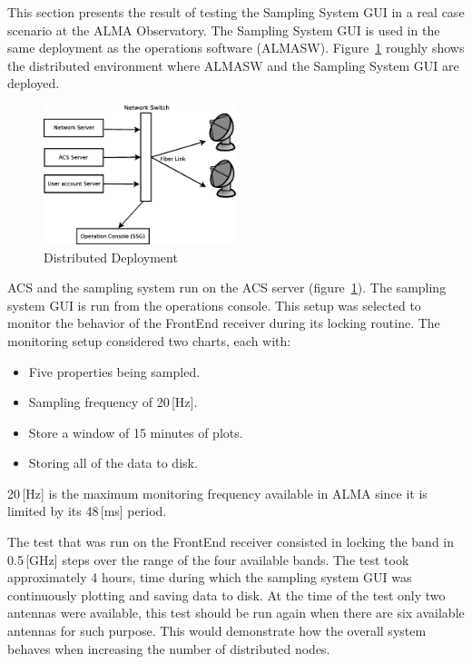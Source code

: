 This section presents the result of testing the Sampling System GUI
in a real case scenario at the ALMA Observatory.
The Sampling System GUI is used in the same deployment as
the operations software (ALMASW).
Figure~\ref{fg:deployment} roughly shows the distributed
environment where ALMASW and the Sampling System GUI are deployed.

\begin{figure}%
  \begin{center}
  \includegraphics[width=0.50\textwidth]{../img/deployment}
  \end{center}
  \caption{Distributed Deployment}
  \label{fg:deployment}
\end{figure}

ACS and the sampling system run on the ACS server
(figure~\ref{fg:deployment}).
The sampling system GUI is run from the operations console.
This setup was selected to monitor the behavior
of the FrontEnd receiver during its locking routine.
The monitoring setup considered two charts, each with:
\begin{itemize}
\item Five properties being sampled.
\item Sampling frequency of 20\,[Hz].
\item Store a window of 15 minutes of plots.
\item Storing all of the data to disk.
\end{itemize}
20\,[Hz] is the maximum monitoring frequency available in ALMA
since it is limited by its 48\,[ms] period.

The test that was run on the FrontEnd receiver consisted
in locking the band in 0.5\,[GHz] steps over the range of
the four available bands. The test took approximately 4 hours,
time during which the sampling system GUI was
continuously plotting and saving data to disk.
At the time of the test only two antennas were available,
this test should be run again when there are six available antennas
for such purpose. This would demonstrate how the
overall system behaves when increasing the number of distributed
nodes.

